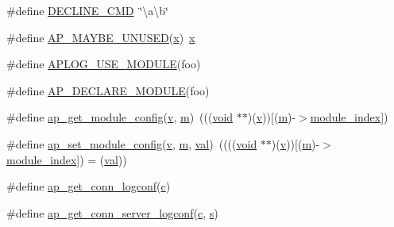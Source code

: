 \begin{DoxyCompactItemize}
\item 
\#define \hyperlink{group__APACHE__CORE__CONFIG_gaba8452f6517f2121414fbf4d44c92fa7}{D\+E\+C\+L\+I\+N\+E\+\_\+\+C\+MD}~\char`\"{}\textbackslash{}a\textbackslash{}b\char`\"{}
\item 
\#define \hyperlink{group__APACHE__CORE__CONFIG_ga9073b4ccaeb79474b9e8750d8a30aede}{A\+P\+\_\+\+M\+A\+Y\+B\+E\+\_\+\+U\+N\+U\+S\+ED}(\hyperlink{pcregrep_8txt_a4242e9148f20c002763bf4ba53b26ad6}{x})~\hyperlink{pcregrep_8txt_a4242e9148f20c002763bf4ba53b26ad6}{x}
\item 
\#define \hyperlink{group__APACHE__CORE__CONFIG_ga0ab98f3a3b7eff6c1bfff7ba15e734d9}{A\+P\+L\+O\+G\+\_\+\+U\+S\+E\+\_\+\+M\+O\+D\+U\+LE}(foo)
\item 
\#define \hyperlink{group__APACHE__CORE__CONFIG_ga662f6bc4b401d52b293a80b1768534af}{A\+P\+\_\+\+D\+E\+C\+L\+A\+R\+E\+\_\+\+M\+O\+D\+U\+LE}(foo)
\item 
\#define \hyperlink{group__APACHE__CORE__CONFIG_ga1093a5908a384eacc929b028c79f2a02}{ap\+\_\+get\+\_\+module\+\_\+config}(\hyperlink{pcregrep_8txt_aeed5af99df1c3051bb73049f9d549819}{v},  \hyperlink{pcretest_8txt_a26e37b17bbd51407fc4163ca327065e4}{m})~(((\hyperlink{group__MOD__ISAPI_gacd6cdbf73df3d9eed42fa493d9b621a6}{void} $\ast$$\ast$)(\hyperlink{pcregrep_8txt_aeed5af99df1c3051bb73049f9d549819}{v}))\mbox{[}(\hyperlink{pcretest_8txt_a26e37b17bbd51407fc4163ca327065e4}{m})-\/$>$\hyperlink{group__APACHE__CORE__SCRIPT_gafe3efe4874f4178a9d30f4a0889957c3}{module\+\_\+index}\mbox{]})
\item 
\#define \hyperlink{group__APACHE__CORE__CONFIG_ga96c3eadc9e6ab6756d05bdcc068a8a10}{ap\+\_\+set\+\_\+module\+\_\+config}(\hyperlink{pcregrep_8txt_aeed5af99df1c3051bb73049f9d549819}{v},  \hyperlink{pcretest_8txt_a26e37b17bbd51407fc4163ca327065e4}{m},  \hyperlink{group__apr__tables_ga4d708cd93abeca73400ed82977502830}{val})~((((\hyperlink{group__MOD__ISAPI_gacd6cdbf73df3d9eed42fa493d9b621a6}{void} $\ast$$\ast$)(\hyperlink{pcregrep_8txt_aeed5af99df1c3051bb73049f9d549819}{v}))\mbox{[}(\hyperlink{pcretest_8txt_a26e37b17bbd51407fc4163ca327065e4}{m})-\/$>$\hyperlink{group__APACHE__CORE__SCRIPT_gafe3efe4874f4178a9d30f4a0889957c3}{module\+\_\+index}\mbox{]}) = (\hyperlink{group__apr__tables_ga4d708cd93abeca73400ed82977502830}{val}))
\item 
\#define \hyperlink{group__APACHE__CORE__CONFIG_ga648a28d8039f093e9814a47a4b695bbb}{ap\+\_\+get\+\_\+conn\+\_\+logconf}(\hyperlink{pcregrep_8txt_aef720ae5f62fa015619d00171d917416}{c})
\item 
\#define \hyperlink{group__APACHE__CORE__CONFIG_ga6a634e3d63d45cf5b67a814c2c54d1e4}{ap\+\_\+get\+\_\+conn\+\_\+server\+\_\+logconf}(\hyperlink{pcregrep_8txt_aef720ae5f62fa015619d00171d917416}{c},  \hyperlink{pcretest_8txt_a062597889ba244b72877454b1d3adecf}{s})

\end{DoxyCompactItemize}
